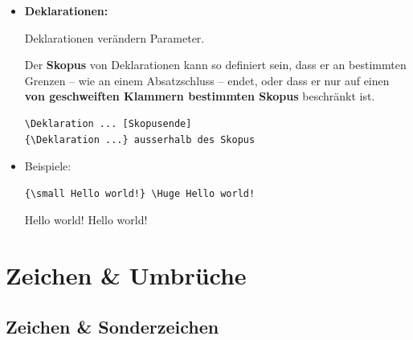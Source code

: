 \begin{frame}

\begin{itemize}
\item \textbf{Deklarationen:}

Deklarationen verändern Parameter. 

Der \textbf{Skopus} von Deklarationen kann so definiert sein, dass er an bestimmten Grenzen -- wie an einem Absatzschluss -- endet, oder dass er nur auf einen \textbf{von geschweiften Klammern bestimmten Skopus} beschränkt ist.

\begin{lstlisting}
\Deklaration ... [Skopusende]
{\Deklaration ...} ausserhalb des Skopus
\end{lstlisting}

	\pause 

\item Beispiele:

\begin{lstlisting}
{\small Hello world!} \Huge Hello world!
\end{lstlisting}

\pause 

\ea 
{\tiny Hello world!} \Huge Hello world!

\z 

\end{itemize}

\end{frame}


\section{Zeichen \& Umbrüche}


\subsection{Zeichen \& Sonderzeichen}

